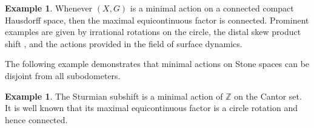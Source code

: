 \documentclass[12pt, reqno]{amsart}
\theoremstyle{definition}
\newtheorem{example}[theorem]{Example}
\theoremstyle{remark}
\numberwithin{equation}{section}
\theoremstyle{theorem}
\theoremstyle{remark}
\begin{document}
    


\begin{example}
    Whenever $(X,G)$ is a minimal action on a connected compact Hausdorff space, then the maximal equicontinuous factor is connected. 
    Prominent examples are given by irrational rotations on the circle, 
    the distal skew product shift \cite[Chapter~7]{auslander1988minimal}, and
    the actions provided in the field of surface dynamics. 
\end{example}

The following example demonstrates that minimal actions on Stone spaces can be disjoint from all subodometers. 

\begin{example}
    The Sturmian subshift is a minimal action of $\mathbb{Z}$ on the Cantor set. It is well known that its maximal equicontinuous factor is a circle rotation and hence connected. 
\end{example}






\end{document}

